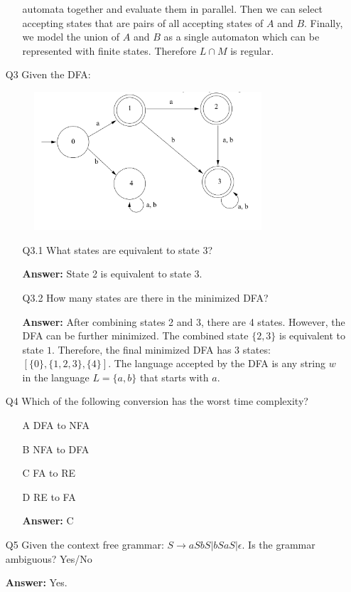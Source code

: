 \documentclass[12pt]{article}
\begin{document}
\begin{itemize}
\begin{itemize}
                automata together and evaluate them in parallel. Then we can
                select accepting states that are pairs of all accepting states
                of $A$ and $B$. Finally, we model the union of $A$ and $B$ as a
                single automaton which can be represented with finite states.
                Therefore $L \cap M$ is regular.
        \end{itemize}
    \item[Q3] Given the DFA:
        \begin{figure}[h]
            \includegraphics[width=0.8\textwidth]{assets/t2_q3.png}
        \end{figure}
        \begin{itemize}
            \item[Q3.1] What states are equivalent to state 3?
            \item[\textbf{Answer:}] State 2 is equivalent to state 3.
            \item[Q3.2] How many states are there in the minimized DFA?
            \item[\textbf{Answer:}] After combining states 2 and 3, there are 4
                states. However, the DFA can be further minimized. The combined
                state $\{2,3\}$ is equivalent to state $1$. Therefore, the final
                minimized DFA has 3 states: $[\{0\}, \{1,2,3\}, \{4\}]$. The
                language accepted by the DFA is any string $w$ in the language
                $L=\{a,b\}$ that starts with $a$.

        \end{itemize}
    \item[Q4] Which of the following conversion has the worst time complexity?
        \begin{itemize}
            \item[A] DFA to NFA
            \item[B] NFA to DFA
            \item[C] FA to RE
            \item[D] RE to FA
            \item[\textbf{Answer:}] C
        \end{itemize}
    \item[Q5] Given the context free grammar: $S \rightarrow
            aSbS|bSaS|\epsilon$. Is the grammar ambiguous? Yes/No
    \item[\textbf{Answer:}] Yes.
\end{itemize}
\end{document}
